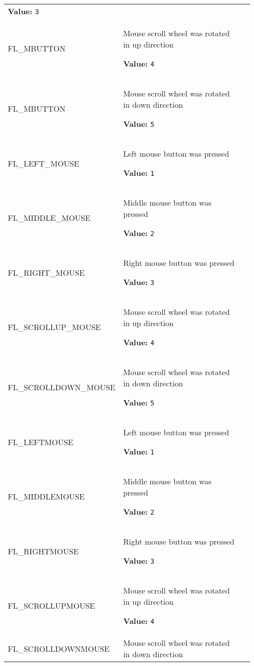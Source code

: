 \begin{longtable}{|p{\varnamewidth}|p{\vardescrwidth}|l}
\textbf{Value:} 
{\tt 3}&\\
\cline{1-2}
\raggedright F\-L\-\_\-M\-B\-U\-T\-T\-O\-N\-4\- & \raggedright Mouse scroll wheel was rotated in up direction

\textbf{Value:} 
{\tt 4}&\\
\cline{1-2}
\raggedright F\-L\-\_\-M\-B\-U\-T\-T\-O\-N\-5\- & \raggedright Mouse scroll wheel was rotated in down direction

\textbf{Value:} 
{\tt 5}&\\
\cline{1-2}
\raggedright F\-L\-\_\-L\-E\-F\-T\-\_\-M\-O\-U\-S\-E\- & \raggedright Left mouse button was pressed

\textbf{Value:} 
{\tt 1}&\\
\cline{1-2}
\raggedright F\-L\-\_\-M\-I\-D\-D\-L\-E\-\_\-M\-O\-U\-S\-E\- & \raggedright Middle mouse button was pressed

\textbf{Value:} 
{\tt 2}&\\
\cline{1-2}
\raggedright F\-L\-\_\-R\-I\-G\-H\-T\-\_\-M\-O\-U\-S\-E\- & \raggedright Right mouse button was pressed

\textbf{Value:} 
{\tt 3}&\\
\cline{1-2}
\raggedright F\-L\-\_\-S\-C\-R\-O\-L\-L\-U\-P\-\_\-M\-O\-U\-S\-E\- & \raggedright Mouse scroll wheel was rotated in up direction

\textbf{Value:} 
{\tt 4}&\\
\cline{1-2}
\raggedright F\-L\-\_\-S\-C\-R\-O\-L\-L\-D\-O\-W\-N\-\_\-M\-O\-U\-S\-E\- & \raggedright Mouse scroll wheel was rotated in down direction

\textbf{Value:} 
{\tt 5}&\\
\cline{1-2}
\raggedright F\-L\-\_\-L\-E\-F\-T\-M\-O\-U\-S\-E\- & \raggedright Left mouse button was pressed

\textbf{Value:} 
{\tt 1}&\\
\cline{1-2}
\raggedright F\-L\-\_\-M\-I\-D\-D\-L\-E\-M\-O\-U\-S\-E\- & \raggedright Middle mouse button was pressed

\textbf{Value:} 
{\tt 2}&\\
\cline{1-2}
\raggedright F\-L\-\_\-R\-I\-G\-H\-T\-M\-O\-U\-S\-E\- & \raggedright Right mouse button was pressed

\textbf{Value:} 
{\tt 3}&\\
\cline{1-2}
\raggedright F\-L\-\_\-S\-C\-R\-O\-L\-L\-U\-P\-M\-O\-U\-S\-E\- & \raggedright Mouse scroll wheel was rotated in up direction

\textbf{Value:} 
{\tt 4}&\\
\cline{1-2}
\raggedright F\-L\-\_\-S\-C\-R\-O\-L\-L\-D\-O\-W\-N\-M\-O\-U\-S\-E\- & \raggedright Mouse scroll wheel was rotated in down direction


\end{longtable}
